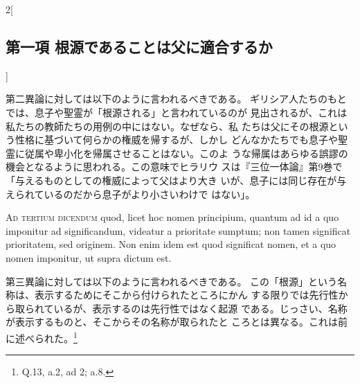\documentclass[paper=a4paper,fontsize=10pt,jafontsize=9pt,titlepage]{jlreq}
\begin{document}
\begin{paracol}{2}[\subsection{第一項 根源であることは父に適合するか}]
\switchcolumn


第二異論に対しては以下のように言われるべきである。
ギリシア人たちのもとでは、息子や聖霊が「根源される」と言われているのが
 見出されるが、これは私たちの教師たちの用例の中にはない。なぜなら、私
 たちは父にその根源という性格に基づいて何らかの権威を帰するが、しかし
どんなかたちでも息子や聖霊に従属や卑小化を帰属させることはない。このよ
 うな帰属はあらゆる誤謬の機会となるように思われる。この意味でヒラリウ
 スは『三位一体論』第9巻で「与えるものとしての権威によって父はより大き
 いが、息子には同じ存在が与えられているのだから息子がより小さいわけで
 はない」。


\switchcolumn*[\subsection{ad.3}]


{\scshape Ad tertium dicendum} quod, licet hoc nomen principium, quantum ad id a
quo imponitur ad significandum, videatur a prioritate sumptum; non
tamen significat prioritatem, sed originem. Non enim idem est quod
significat nomen, et a quo nomen imponitur, ut supra dictum est.


\switchcolumn


第三異論に対しては以下のように言われるべきである。
この「根源」という名称は、表示するためにそこから付けられたところにかん
 する限りでは先行性から取られているが、表示するのは先行性ではなく起源
 である。じっさい、名称が表示するものと、そこからその名称が取られたと
 ころとは異なる。これは前に述べられた。\footnote{Q.13, a.2, ad 2; a.8.}


\switchcolumn*



\end{paracol}
\newpage




\end{document}
